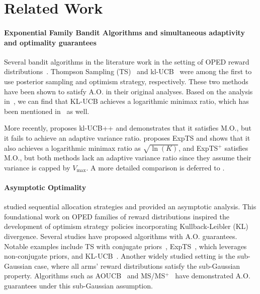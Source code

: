\section{Related Work} \label{sec:related}

\paragraph{Exponential Family Bandit Algorithms and simultaneous adaptivity and optimality guarantees} Several bandit algorithms in the literature work in the setting of OPED reward distributions~\citep{korda2013thompson, cappe2013kullback, menard17minimax}. 
Thompson Sampling 
(TS)~\citep{thompson1933likelihood} and kl-UCB~\citep{cappe2013kullback} were among the first to use posterior sampling and optimism strategy, respectively. 
These two methods have been shown to satisfy A.O. in their original analyses. 
Based on the analysis in~\citet{lattimore20bandit}, we can find that KL-UCB achieves a logarithmic minimax ratio, which has been mentioned in~\citet{qin2023kullback} as well.


More recently, \citet{menard17minimax} proposes kl-UCB++ and demonstrates that it satisfies M.O., but it fails to achieve an adaptive variance ratio. 
\citet{jin2022finite} proposes ExpTS and shows that it also achieves a logarithmic minimax ratio as $\sqrt{\ln(K)}$, and ExpTS$^+$ satisfies M.O., but both methods lack an adaptive variance ratio since they assume their variance is capped by $V_{\max}$. 
A more detailed comparison is deferred to .


\paragraph{Asymptotic Optimality} \citet{lai85asymptotically} studied sequential allocation strategies and provided an asymptotic analysis. This foundational work on OPED families of reward distributions inspired the development of optimism strategy policies incorporating Kullback-Leibler (KL) divergence.
Several studies have proposed algorithms with A.O. guarantees. Notable examples include TS with conjugate priors~\citep{korda2013thompson}, ExpTS~\citep{jin2022finite}, which leverages non-conjugate priors, and KL-UCB~\citep{cappe2013kullback}. Another widely studied setting is the sub-Gaussian case, where all arms' reward distributions satisfy the sub-Gaussian property. Algorithms such as AOUCB~\citep{lattimore20bandit} and MS/MS$^+$~\citep{bian2022maillard} have demonstrated A.O. guarantees under this sub-Gaussian assumption.


